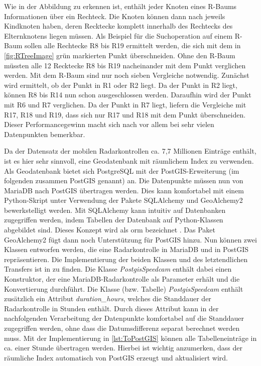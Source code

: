 Wie in der Abbildung zu erkennen ist, enthält jeder Knoten eines R-Baums Informationen über ein Rechteck.
Die Knoten können dann nach \cite{RTrees} jeweils Kindknoten haben, deren Recktecke komplett innerhalb des Rechtecks des Elternknotens liegen müssen.
Als Beispiel für die Suchoperation auf einem R-Baum sollen alle Rechtecke R8 bis R19 ermittelt werden, die sich mit dem in \autoref{fig:RTreeImage} grün markierten Punkt überschneiden.
Ohne den R-Baum müssten alle 12 Recktecke R8 bis R19 nacheinander mit dem Punkt verglichen werden.
Mit dem R-Baum sind nur noch sieben Vergleiche notwendig.
Zunächst wird ermittelt, ob der Punkt in R1 oder R2 liegt.
Da der Punkt in R2 liegt, können R8 bis R14 nun schon ausgeschlossen werden.
Daraufhin wird der Punkt mit R6 und R7 verglichen.
Da der Punkt in R7 liegt, liefern die Vergleiche mit R17, R18 und R19, dass sich nur R17 und R18 mit dem Punkt überschneiden.
Dieser Performancegewinn macht sich nach \cite{RTrees} vor allem bei sehr vielen Datenpunkten bemerkbar.

Da der Datensatz der mobilen Radarkontrollen ca. 7,7 Millionen Einträge enthält, ist es hier sehr sinnvoll, eine Geodatenbank mit räumlichem Index zu verwenden.
Als Geodatenbank bietet sich PostgreSQL mit der PostGIS-Erweiterung (im folgenden zusammen PostGIS genannt) an.
Die Datenpunkte müssen nun von MariaDB nach PostGIS übertragen werden.
Dies kann komfortabel mit einem Python-Skript unter Verwendung der Pakete SQLAlchemy und GeoAlchemy2 bewerkstelligt werden.
Mit SQLAlchemy kann intuitiv auf Datenbanken zugegriffen werden, indem Tabellen der Datenbank auf Python-Klassen abgebildet sind.
Dieses Konzept wird als \acrfull{orm} bezeichnet \cite{SQLAlchemyKeyFeatures}.
Das Paket GeoAlchemy2 fügt dann noch Unterstützung für PostGIS hinzu.
Nun können zwei Klassen entworfen werden, die eine Radarkontrolle in MariaDB und in PostGIS repräsentieren.
Die Implementierung der beiden Klassen und des letztendlichen Transfers ist in  zu finden.
Die Klasse \emph{PostgisSpeedcam} enthält dabei einen Konstruktor, der eine MariaDB-Radarkontrolle als Parameter erhält und die Konvertierung durchführt.
Die Klasse (bzw. Tabelle) \emph{PostgisSpeedcam} enthält zusätzlich ein Attribut \emph{duration\_hours}, welches die Standdauer der Radarkontrolle in Stunden enthält.
Durch dieses Attribut kann in der nachfolgenden Verarbeitung der Datenpunkte komfortabel auf die Standdauer zugegriffen werden, ohne dass die Datumsdifferenz separat berechnet werden muss.
Mit der Implementierung in \autoref{lst:ToPostGIS} können alle Tabelleneinträge in ca. einer Stunde übertragen werden.
Hierbei ist wichtig anzumerken, dass der räumliche Index automatisch von PostGIS erzeugt und aktualisiert wird.


